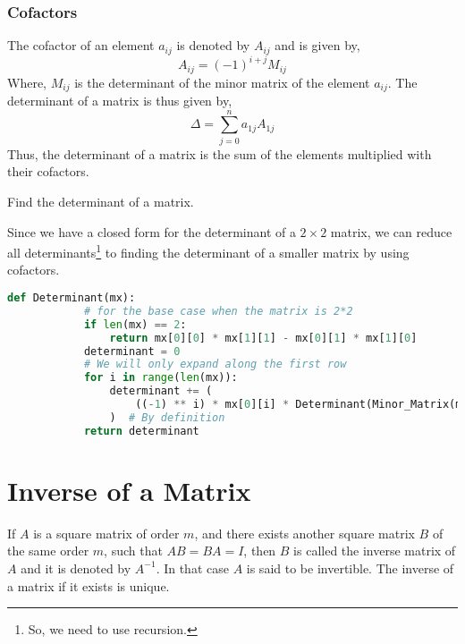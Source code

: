 \subsubsection{Cofactors}
The cofactor of an element $a_{ij}$ is denoted by $A_{ij}$ and is given by,
\[A_{ij}=(-1)^{i+j}M_{ij}\]
Where, $M_{ij}$ is the determinant of the minor matrix of the element $a_{ij}$.
The determinant of a matrix is thus given by,
\[\Delta=\sum\limits_{j=0}^n a_{1j}A_{1j}\]
Thus, the determinant of a matrix is the sum of the elements multiplied with their cofactors.
\begin{eg}
	Find the determinant of a matrix.
\end{eg}
\begin{explanation}
	Since we have a closed form for the determinant of a $2\times 2$ matrix, we can reduce all determinants\footnote{So, we need to use recursion.} to finding the determinant of a smaller matrix by using cofactors.
	\begin{lstlisting}[language=Python]
			def Determinant(mx):
			# for the base case when the matrix is 2*2
			if len(mx) == 2:
				return mx[0][0] * mx[1][1] - mx[0][1] * mx[1][0]
			determinant = 0
			# We will only expand along the first row
			for i in range(len(mx)):
				determinant += (
					((-1) ** i) * mx[0][i] * Determinant(Minor_Matrix(mx, 0, i))
				)  # By definition
			return determinant \end{lstlisting}
\end{explanation}
\section{Inverse of a Matrix}
If $A$ is a square matrix of order $m$, and there exists another square matrix $B$ of the same order $m$, such that $AB=BA=I$, then $B$ is called the inverse matrix of $A$ and it is denoted by $A^{-1}$. In that case $A$ is said to be invertible. The inverse of a matrix if it exists is unique.\
